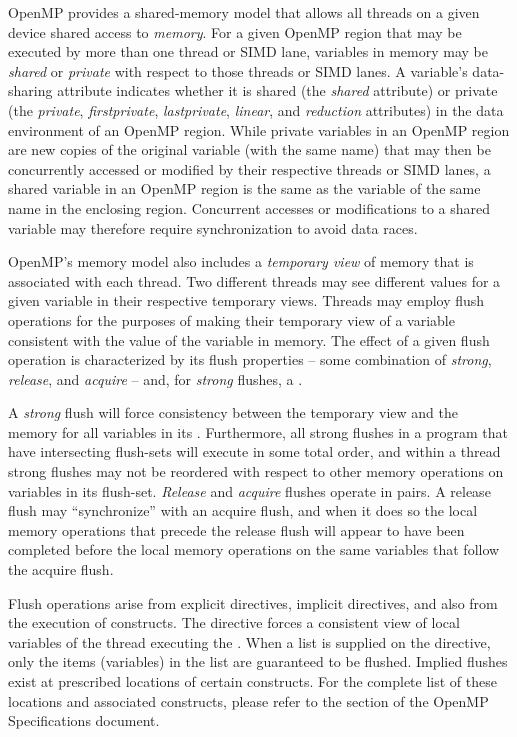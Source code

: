\label{chap:memory_model}

OpenMP provides a shared-memory model that allows all threads on a given
device shared access to \emph{memory}. For a given OpenMP region that may be
executed by more than one thread or SIMD lane, variables in memory may be
\emph{shared} or \emph{private} with respect to those threads or SIMD lanes. A
variable's data-sharing attribute indicates whether it is shared (the
\emph{shared} attribute) or private (the \emph{private}, \emph{firstprivate},
\emph{lastprivate}, \emph{linear}, and \emph{reduction} attributes) in the data
environment of an OpenMP region. While private variables in an OpenMP region
are new copies of the original variable (with the same name) that may then be
concurrently accessed or modified by their respective threads or SIMD lanes, a
shared variable in an OpenMP region is the same as the variable of the same
name in the enclosing region. Concurrent accesses or modifications to a
shared variable may therefore require synchronization to avoid data races.

OpenMP's memory model also includes a \emph{temporary view} of memory that is
associated with each thread. Two different threads may see different values for
a given variable in their respective temporary views. Threads may employ flush
operations for the purposes of making their temporary view of a variable
consistent with the value of the variable in memory. The effect of a given
flush operation is characterized by its flush properties -- some combination of
\emph{strong}, \emph{release}, and \emph{acquire} -- and, for \emph{strong}
flushes, a .

A \emph{strong} flush will force consistency between the temporary view and the
memory for all variables in its .  Furthermore, all strong flushes in a
program that have intersecting flush-sets will execute in some total order, and
within a thread strong flushes may not be reordered with respect to other
memory operations on variables in its flush-set. \emph{Release} and
\emph{acquire} flushes operate in pairs. A release flush may ``synchronize''
with an acquire flush, and when it does so the local memory operations that
precede the release flush will appear to have been completed before the local
memory operations on the same variables that follow the acquire flush.

Flush operations arise from explicit  directives, implicit
 directives, and also from the execution of 
constructs. The  directive forces a consistent view of local
variables of the thread executing the .  When a list is supplied on
the directive, only the items (variables) in the list are guaranteed to be
flushed.  Implied flushes exist at prescribed locations of certain constructs.
For the complete list of these locations and associated constructs, please
refer to the  section of the OpenMP Specifications
document.

